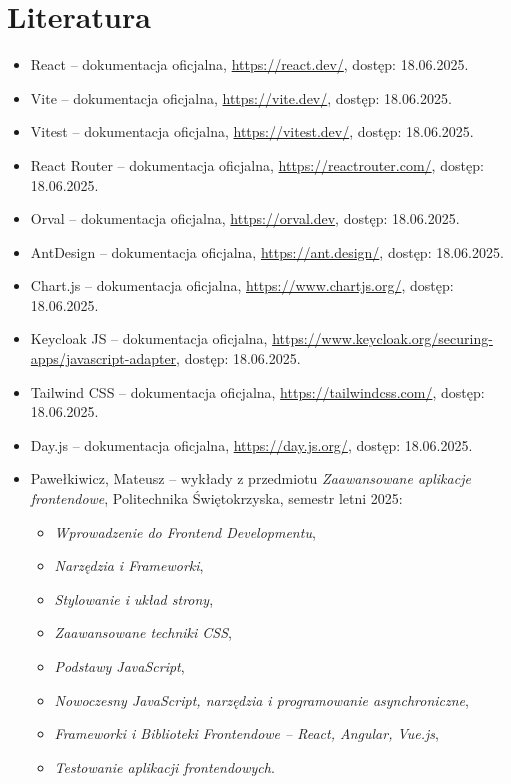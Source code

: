 \documentclass[../../spr.tex]{subfiles}
\begin{document}
\section{Literatura}
    \begin{itemize}
        \item React – dokumentacja oficjalna, \url{https://react.dev/}, dostęp: 18.06.2025.
        \item Vite – dokumentacja oficjalna, \url{https://vite.dev/}, dostęp: 18.06.2025.
        \item Vitest – dokumentacja oficjalna, \url{https://vitest.dev/}, dostęp: 18.06.2025.
        \item React Router – dokumentacja oficjalna, \url{https://reactrouter.com/}, dostęp: 18.06.2025.
        \item Orval – dokumentacja oficjalna, \url{https://orval.dev}, dostęp: 18.06.2025.
        \item AntDesign – dokumentacja oficjalna, \url{https://ant.design/}, dostęp: 18.06.2025.
        \item Chart.js – dokumentacja oficjalna, \url{https://www.chartjs.org/}, dostęp: 18.06.2025.
        \item Keycloak JS – dokumentacja oficjalna, \url{https://www.keycloak.org/securing-apps/javascript-adapter}, dostęp: 18.06.2025.
        \item Tailwind CSS – dokumentacja oficjalna, \url{https://tailwindcss.com/}, dostęp: 18.06.2025.
        \item Day.js – dokumentacja oficjalna, \url{https://day.js.org/}, dostęp: 18.06.2025.
        \item Pawełkiwicz, Mateusz – wykłady z przedmiotu \textit{Zaawansowane aplikacje frontendowe}, Politechnika Świętokrzyska, semestr letni 2025:
        \begin{itemize}
            \item \textit{Wprowadzenie do Frontend Developmentu},
            \item \textit{Narzędzia i Frameworki},
            \item \textit{Stylowanie i układ strony},
            \item \textit{Zaawansowane techniki CSS},
            \item \textit{Podstawy JavaScript},
            \item \textit{Nowoczesny JavaScript, narzędzia i programowanie asynchroniczne},
            \item \textit{Frameworki i Biblioteki Frontendowe – React, Angular, Vue.js},
            \item \textit{Testowanie aplikacji frontendowych}.
        \end{itemize}
    \end{itemize}
\end{document}
